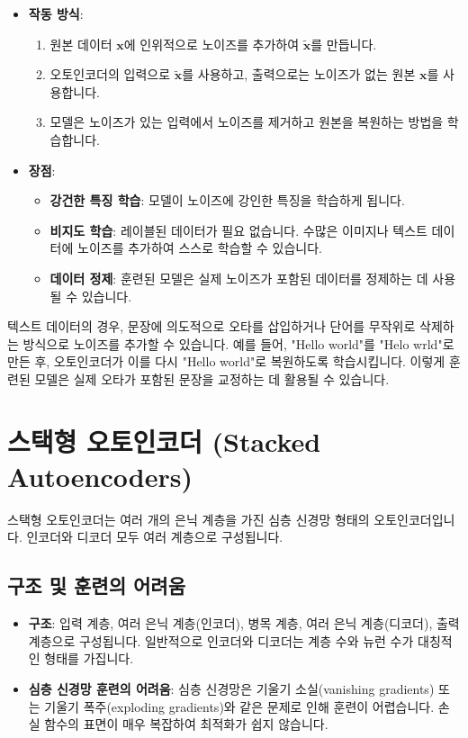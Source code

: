 \documentclass[11pt,a4paper]{article}
\begin{document}
\begin{itemize}
    \item \textbf{작동 방식}:
        \begin{enumerate}
            \item 원본 데이터 $\mathbf{x}$에 인위적으로 노이즈를 추가하여 $\tilde{\mathbf{x}}$를 만듭니다.
            \item 오토인코더의 입력으로 $\tilde{\mathbf{x}}$를 사용하고, 출력으로는 노이즈가 없는 원본 $\mathbf{x}$를 사용합니다.
            \item 모델은 노이즈가 있는 입력에서 노이즈를 제거하고 원본을 복원하는 방법을 학습합니다.
        \end{enumerate}
    \item \textbf{장점}:
        \begin{itemize}
            \item \textbf{강건한 특징 학습}: 모델이 노이즈에 강인한 특징을 학습하게 됩니다.
            \item \textbf{비지도 학습}: 레이블된 데이터가 필요 없습니다. 수많은 이미지나 텍스트 데이터에 노이즈를 추가하여 스스로 학습할 수 있습니다.
            \item \textbf{데이터 정제}: 훈련된 모델은 실제 노이즈가 포함된 데이터를 정제하는 데 사용될 수 있습니다.
        \end{itemize}
\end{itemize}

\begin{examplebox}
텍스트 데이터의 경우, 문장에 의도적으로 오타를 삽입하거나 단어를 무작위로 삭제하는 방식으로 노이즈를 추가할 수 있습니다. 예를 들어, "Hello world"를 "Helo wrld"로 만든 후, 오토인코더가 이를 다시 "Hello world"로 복원하도록 학습시킵니다. 이렇게 훈련된 모델은 실제 오타가 포함된 문장을 교정하는 데 활용될 수 있습니다.
\end{examplebox}

\newpage
\section{스택형 오토인코더 (Stacked Autoencoders)}
스택형 오토인코더는 여러 개의 은닉 계층을 가진 심층 신경망 형태의 오토인코더입니다. 인코더와 디코더 모두 여러 계층으로 구성됩니다.

\subsection{구조 및 훈련의 어려움}
\begin{itemize}
    \item \textbf{구조}: 입력 계층, 여러 은닉 계층(인코더), 병목 계층, 여러 은닉 계층(디코더), 출력 계층으로 구성됩니다. 일반적으로 인코더와 디코더는 계층 수와 뉴런 수가 대칭적인 형태를 가집니다.
    \item \textbf{심층 신경망 훈련의 어려움}: 심층 신경망은 기울기 소실(vanishing gradients) 또는 기울기 폭주(exploding gradients)와 같은 문제로 인해 훈련이 어렵습니다. 손실 함수의 표면이 매우 복잡하여 최적화가 쉽지 않습니다.
\end{itemize}
\end{document}
